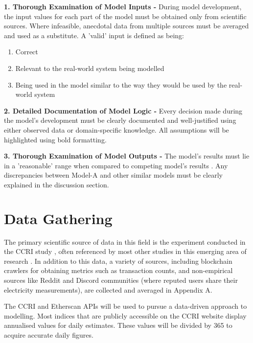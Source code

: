 \textbf{1. Thorough Examination of Model Inputs - } During model development, the input values for each part of the model must be obtained only from scientific sources. Where infeasible, anecdotal data from multiple sources must be averaged and used as a substitute. A 'valid' input is defined as being:
\begin{enumerate}
    \item Correct
    \item Relevant to the real-world system being modelled
    \item Being used in the model similar to the way they would be used by the real-world system
\end{enumerate}  

\textbf{2. Detailed Documentation of Model Logic - }
Every decision made during the model's development must be clearly documented and well-justified using either observed data or domain-specific knowledge. All assumptions will be highlighted using bold formatting.


\textbf{3. Thorough Examination of Model Outputs - }
The model's results must lie in a 'reasonable' range when compared to competing model's results \cite{Al-Aomar2015ModelTechniques}. Any discrepancies between Model-A and other similar models must be clearly explained in the discussion section.   

\section {Data Gathering}

The primary scientific source of data in this field is the experiment conducted in the CCRI study \cite{CryptoCarbonRatingsInstitute2022TheNetwork}, often referenced by most other studies in this emerging area of research \cite{IbanezTheExpansion}. In addition to this data, a variety of sources, including blockchain crawlers for obtaining metrics such as transaction counts, and non-empirical sources like Reddit and Discord communities (where reputed users share their electricity measurements), are collected and averaged in Appendix A.

The CCRI \cite{Ccri-apiOverview} and Etherscan \cite{EtherscanProvider} APIs will be used to pursue a data-driven approach to modelling. Most indices that are publicly accessible on the CCRI website display annualised values for daily estimates. These values will be divided by 365 to acquire accurate daily figures.


